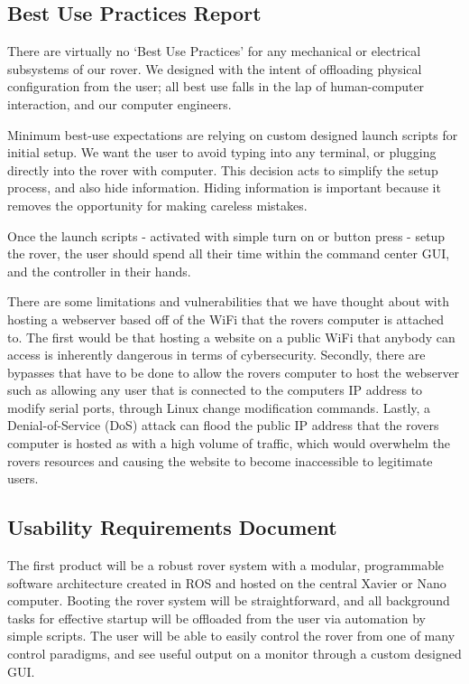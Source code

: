 \documentclass[a4paper, 10pt]{article}
\begin{document}
	\subsection{Best Use Practices Report}
	There are virtually no `Best Use Practices' for any mechanical or electrical subsystems of our rover. We designed with the intent of offloading physical configuration from the user; all best use falls in the lap of human-computer interaction, and our computer engineers.
	
	Minimum best-use expectations are relying on custom designed launch scripts for initial setup. We want the user to avoid typing into any terminal, or plugging directly into the rover with computer. This decision acts to simplify the setup process, and also hide information. Hiding information is important because it removes the opportunity for making careless mistakes. 
	
	Once the launch scripts - activated with simple turn on or button press - setup the rover, the user should spend all their time within the command center GUI, and the controller in their hands.

    There are some limitations and vulnerabilities that we have thought about with hosting a webserver based off of the WiFi that the rovers computer is attached to. The first would be that hosting a website on a public WiFi that anybody can access is inherently dangerous in terms of cybersecurity. Secondly, there are bypasses that have to be done to allow the rovers computer to host the webserver such as allowing any user that is connected to the computers IP address to modify serial ports, through Linux change modification commands. Lastly, a Denial-of-Service (DoS) attack can flood the public IP address that the rovers computer is hosted as with a high volume of traffic, which would overwhelm the rovers resources and causing the website to become inaccessible to legitimate users.

	\subsection{Usability Requirements Document}
	The first product will be a robust rover system with a modular, programmable software architecture created in ROS and hosted on the central Xavier or Nano computer. Booting the rover system will be straightforward, and all background tasks for effective startup will be offloaded from the user via automation by simple scripts. The user will be able to easily control the rover from one of many control paradigms, and see useful output on a monitor through a custom designed GUI. 
\end{document}
